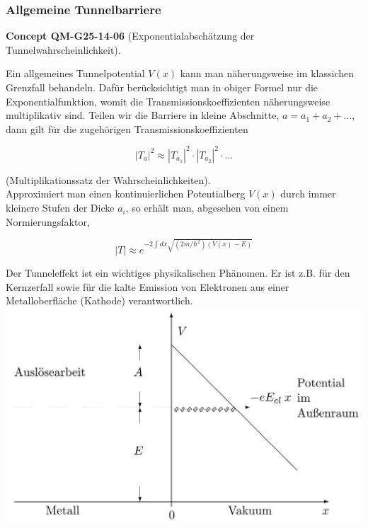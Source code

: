 \documentclass[10pt, letterpaper]{article}
\newcommand{\CustomHeading}[3]{%
  \par\medskip\noindent%
  \textbf{#1 #2} \textnormal{(#3)}.\enskip%
}
\newenvironment{CONC}[2]{\begin{unitbox}\CustomHeading{Concept}{#1}{#2}}{\end{unitbox}}
\begin{document}
\subsubsection*{Allgemeine Tunnelbarriere}


\begin{CONC}{QM-G25-14-06}{Exponentialabschätzung der Tunnelwahrscheinlichkeit}
Ein allgemeines Tunnelpotential $V(x)$ kann man näherungsweise im klassichen Grenzfall behandeln. Dafür berücksichtigt man in obiger Formel nur die Exponentialfunktion, womit die Transmissionskoeffizienten näherungsweise multiplikativ sind. Teilen wir die Barriere in kleine Abschnitte, $a=a_{1}+a_{2}+\ldots$, dann gilt für die zugehörigen Transmissionskoeffizienten

$$
\left|T_{a}\right|^{2} \approx\left|T_{a_{1}}\right|^{2} \cdot\left|T_{a_{2}}\right|^{2} \cdot \ldots
$$

(Multiplikationssatz der Wahrscheinlichkeiten).\\
Approximiert man einen kontinuierlichen Potentialberg $V(x)$ durch immer kleinere Stufen der Dicke $a_{i}$, so erhält man, abgesehen von einem Normierungsfaktor,

$$
|T| \approx e^{-2 \int d x \sqrt{\left(2 m / \hbar^{2}\right)(V(x)-E)}}
$$

Der Tunneleffekt ist ein wichtiges physikalischen Phänomen. Er ist z.B. für den Kernzerfall sowie für die kalte Emission von Elektronen aus einer Metalloberfläche (Kathode) verantwortlich.\\
\includegraphics[scale=0.2, center]{2025_05_21_2790b5a0182e53887e3bg-11}
\end{CONC}






\pagebreak
\end{document}
